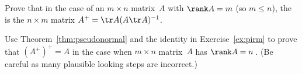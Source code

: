 \begin{exercise} \label{ex:pirm} 
Prove that in the case of an \(m\times n\) matrix~\(A\) with \(\rank A=m\) (so \(m\leq n\)), the  is the \(n\times m\) matrix \(A^+=\tr A(A\tr A)^{-1}\).
\end{exercise}





\begin{exercise} \label{ex:} 
Use Theorem~\ref{thm:pseudonormal} and the identity in Exercise~\ref{ex:pirm} to prove that \((A^+)^+=A\) in the case when \(m\times n\) matrix~\(A\) has \(\rank A=n\)\,.
(Be careful as many plausible looking steps are incorrect.)
\end{exercise}




\begin{comment}
More exercises of pseudo-inverse could prove conditionally \((cA)^+=(1/c)A^+\), \((A^+)^+=A\), \((\tr A)^+=\tr{(A^+)}\).
More exercises on function composition.
\end{comment}






